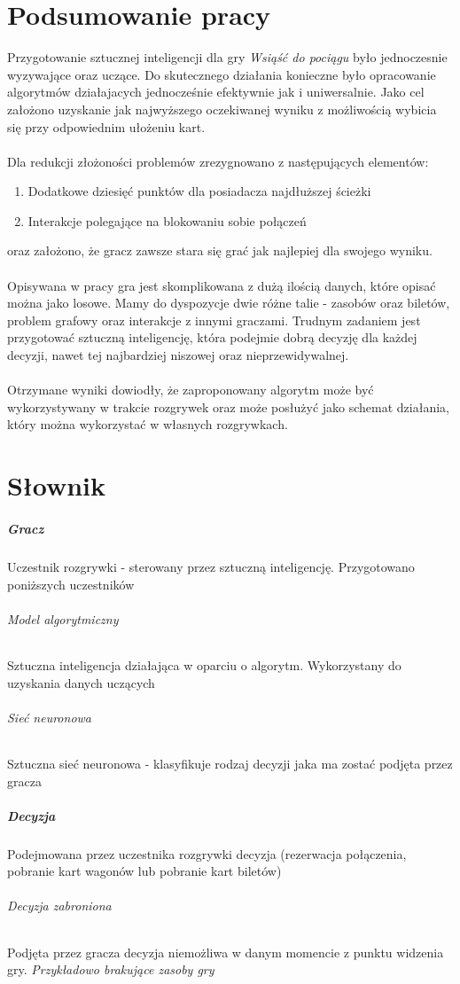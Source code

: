 \documentclass[12pt, oneside]{report}
\begin{document}
\chapter{Podsumowanie pracy}
Przygotowanie sztucznej inteligencji dla gry \textit{Wsiąść do pociągu} było jednoczesnie wyzywające oraz uczące. Do skutecznego działania konieczne było opracowanie algorytmów działajacych jednocześnie efektywnie jak i uniwersalnie. Jako cel założono uzyskanie jak najwyższego oczekiwanej wyniku z możliwością wybicia się przy odpowiednim ułożeniu kart. \\ \\ 
Dla redukcji złożoności problemów zrezygnowano z następujących elementów:
\begin{enumerate}
	\item Dodatkowe dziesięć punktów dla posiadacza najdłuższej ścieżki
	\item Interakcje polegające na blokowaniu sobie połączeń
\end{enumerate}
oraz założono, że gracz zawsze stara się grać jak najlepiej dla swojego wyniku. \\ \\  
Opisywana w pracy gra jest skomplikowana z dużą ilością danych, które opisać można jako losowe. Mamy do dyspozycje dwie różne talie - zasobów oraz biletów, problem grafowy oraz interakcje z innymi graczami. Trudnym zadaniem jest przygotować sztuczną inteligencję, która podejmie dobrą decyzję dla każdej decyzji, nawet tej najbardziej niszowej oraz nieprzewidywalnej. \\ \\ 
Otrzymane wyniki dowiodły, że zaproponowany algorytm może być wykorzystywany w trakcie rozgrywek oraz może posłużyć jako schemat działania, który można wykorzystać w własnych rozgrywkach. 
\chapter{Słownik}
\paragraph{Gracz}
Uczestnik rozgrywki - sterowany przez sztuczną inteligencję. Przygotowano poniższych uczestników
\subparagraph{Model algorytmiczny} Sztuczna inteligencja działająca w oparciu o algorytm. Wykorzystany do uzyskania danych uczących
\subparagraph{Sieć neuronowa} Sztuczna sieć neuronowa - klasyfikuje rodzaj decyzji jaka ma zostać podjęta przez gracza
\paragraph{Decyzja}
Podejmowana przez uczestnika rozgrywki decyzja (rezerwacja połączenia, pobranie kart wagonów lub pobranie kart biletów)
\subparagraph{Decyzja zabroniona}
Podjęta przez gracza decyzja niemożliwa w danym momencie z punktu widzenia gry. \textit{Przykładowo brakujące zasoby gry}
\end{document}
